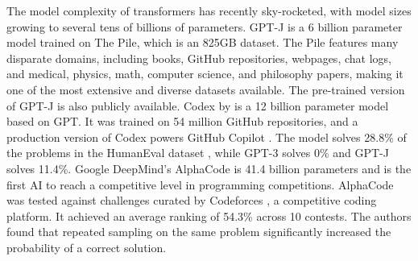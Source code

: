 The model complexity of transformers has recently sky-rocketed, with model sizes growing to several tens of billions of parameters. GPT-J is a 6 billion parameter model trained on The Pile, which is an 825GB dataset.  The Pile features many disparate domains, including books, GitHub repositories, webpages, chat logs, and medical, physics, math, computer science, and philosophy papers, making it one of the most extensive and diverse datasets available. The pre-trained version of GPT-J is also publicly available. Codex by \textcite{chen2021codex} is a 12 billion parameter model based on GPT. It was trained on 54 million GitHub repositories, and a production version of Codex powers GitHub Copilot \cite{copilot}. The model solves 28.8\% of the problems in the HumanEval dataset \cite{chen2021codex}, while GPT-3 solves 0\% and GPT-J solves 11.4\%. Google DeepMind's AlphaCode \cite{alphacode} is 41.4 billion parameters and is the first AI to reach a competitive level in programming competitions. AlphaCode was tested against challenges curated by Codeforces , a competitive coding platform. It achieved an average ranking of 54.3\% across 10 contests. The authors found that repeated sampling on the same problem significantly increased the probability of a correct solution.


\newcommand*\emptycirc[1][1ex]{\tikz\draw (0,0) circle (#1);} 
\newcommand*\halfcirc[1][1ex]{%
  \begin{tikzpicture}
  \draw[fill] (0,0)-- (90:#1) arc (90:270:#1) -- cycle ;
  \draw (0,0) circle (#1);
  \end{tikzpicture}}
\newcommand*\fullcirc[1][1ex]{\tikz\fill (0,0) circle (#1);} 


